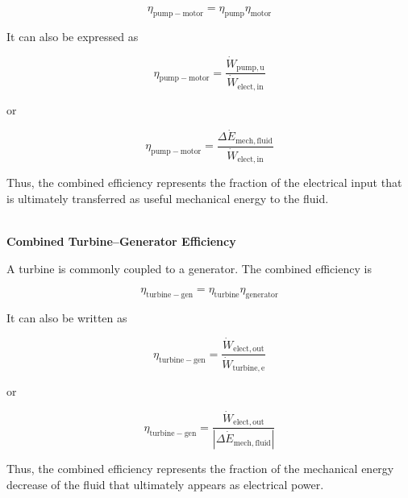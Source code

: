 \documentclass[12pt]{article}
\begin{document}
\begin{equation*}
\eta_{\mathrm{pump-motor}}
=
\eta_{\mathrm{pump}}
\eta_{\mathrm{motor}}
\end{equation*}

It can also be expressed as

\begin{equation*}
\eta_{\mathrm{pump-motor}}
=
\frac{\dot{W}_{\mathrm{pump,u}}}
{\dot{W}_{\mathrm{elect,in}}}
\end{equation*}

or

\begin{equation*}
\eta_{\mathrm{pump-motor}}
=
\frac{\Delta\dot{E}_{\mathrm{mech,fluid}}}
{\dot{W}_{\mathrm{elect,in}}}
\end{equation*}

Thus, the combined efficiency represents the fraction of the electrical input that is ultimately transferred as useful mechanical energy to the fluid. 

\textbf{\\ Combined Turbine--Generator Efficiency}

A turbine is commonly coupled to a generator. The combined efficiency is

\begin{equation*}
\eta_{\mathrm{turbine-gen}}
=
\eta_{\mathrm{turbine}}
\eta_{\mathrm{generator}}
\end{equation*}

It can also be written as

\begin{equation*}
\eta_{\mathrm{turbine-gen}}
=
\frac{\dot{W}_{\mathrm{elect,out}}}
{\dot{W}_{\mathrm{turbine,e}}}
\end{equation*}

or

\begin{equation*}
\eta_{\mathrm{turbine-gen}}
=
\frac{\dot{W}_{\mathrm{elect,out}}}
{\left|\Delta\dot{E}_{\mathrm{mech,fluid}}\right|}
\end{equation*}

Thus, the combined efficiency represents the fraction of the mechanical energy decrease of the fluid that ultimately appears as electrical power. 
\end{document}
